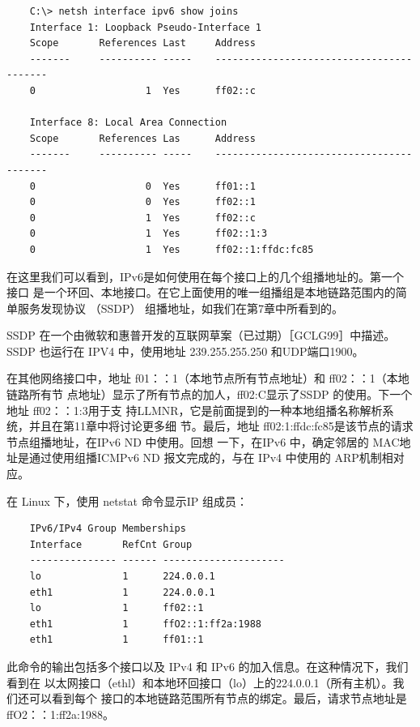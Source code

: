 \begin{verbatim}
    C:\> netsh interface ipv6 show joins
    Interface 1: Loopback Pseudo-Interface 1
    Scope       References Last     Address
    -------     ---------- -----    -----------------------------------------
    0                   1  Yes      ff02::c

    Interface 8: Local Area Connection
    Scope       References Las      Address
    -------     ---------- -----    -----------------------------------------
    0                   0  Yes      ff01::1
    0                   0  Yes      ff02::1
    0                   1  Yes      ff02::c
    0                   1  Yes      ff02::1:3
    0                   1  Yes      ff02::1:ffdc:fc85
\end{verbatim}

在这里我们可以看到，IPv6是如何使用在每个接口上的几个组播地址的。第一个接口
是一个环回、本地接口。在它上面使用的唯一组播组是本地链路范围内的简单服务发现协议
（SSDP） 组播地址，如我们在第7章中所看到的。

\begin{tcolorbox}
    SSDP 在一个由微软和惠普开发的互联网草案（已过期）［GCLG99］中描述。
    SSDP 也运行在 IPV4 中，使用地址 239.255.255.250 和UDP端口1900。
\end{tcolorbox}

在其他网络接口中，地址 f01：：1（本地节点所有节点地址）和 ff02：：1（本地链路所有节
点地址）显示了所有节点的加人，ff02:C显示了SSDP 的使用。下一个地址 ff02：：1:3用于支
持LLMNR，它是前面提到的一种本地组播名称解析系统，并且在第11章中将讨论更多细
节。最后，地址 ff02:1:ffdc:fc85是该节点的请求节点组播地址，在IPv6 ND 中使用。回想
一下，在IPv6 中，确定邻居的 MAC地址是通过使用组播ICMPv6 ND 报文完成的，与在
IPv4 中使用的 ARP机制相对应。

在 Linux 下，使用 netstat 命令显示IP 组成员：

\begin{verbatim}
    IPv6/IPv4 Group Memberships
    Interface       RefCnt Group
    --------------- ------ ---------------------
    lo              1      224.0.0.1
    eth1            1      224.0.0.1
    lo              1      ff02::1
    eth1            1      ffO2::1:ff2a:1988
    eth1            1      ff01::1
\end{verbatim}

此命令的输出包括多个接口以及 IPv4 和 IPv6 的加入信息。在这种情况下，我们看到在
以太网接口（ethl）和本地环回接口（lo）上的224.0.0.1（所有主机）。我们还可以看到每个
接口的本地链路范围所有节点的绑定。最后，请求节点地址是 ffO2：：1:ff2a:1988。

